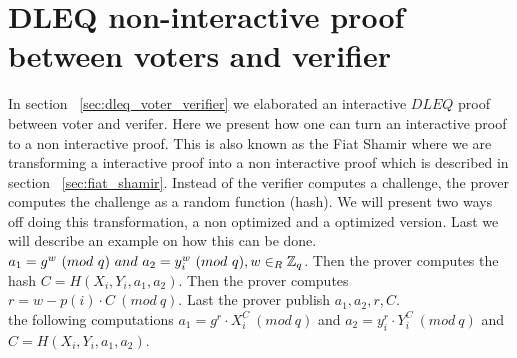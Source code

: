 \section{DLEQ non-interactive proof between voters and verifier}
\label{sec:dleq_non-interactive-proof-between_voters_and_verifier}
In section  ~\ref{sec:dleq_voter_verifier} we elaborated an interactive $DLEQ$ proof between voter and verifer. Here we present how one can turn an interactive proof to a non interactive proof. This is also known as the Fiat Shamir where we are transforming a interactive proof into a non interactive proof which is described in section ~\ref{sec:fiat_shamir}. Instead of the verifier computes a challenge, the prover computes the challenge as a random function (hash).  We will present two ways off doing this transformation, a non optimized and a optimized version. Last we will describe an example on how this can be done.\\


 \begin{math}a_1=g^w \ (mod\ q)  \ and \ a_2=y_i^w \ (mod\ q),  w\in_R \Z_q \end{math}. Then the prover computes the hash \begin{math}C=H(X_i,Y_i,a_1,a_2) \end{math}. Then the prover computes  \begin{math}r=w-p(i)  \cdot  C \ (mod\ q)\end{math}. Last the prover publish \begin{math}a_1, a_2,r,C\end{math}. \\

\noindent
{} the following computations \begin{math}a_1 = g^r \cdot X_i^C  \ (mod\ q)\end{math} and \begin{math} a_2=y_i^r  \cdot  Y_i^C \ (mod\ q)\end{math} and \begin{math}C=H(X_i,Y_i,a_1,a_2)\end{math}.


